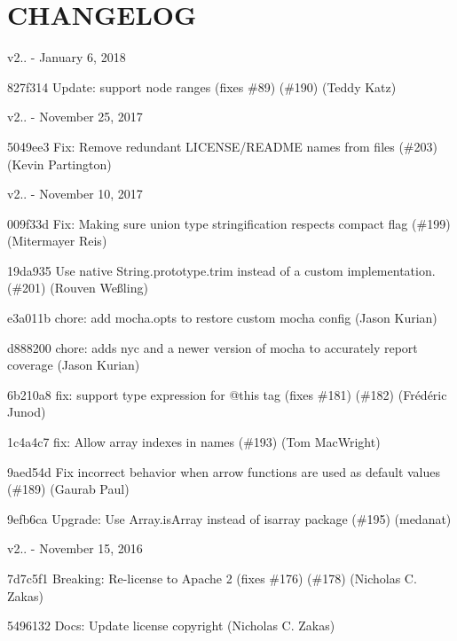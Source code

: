 \chapter{CHANGELOG}
\hypertarget{md_node__modules_2eslint-plugin-react_2node__modules_2doctrine_2CHANGELOG}{}\label{md_node__modules_2eslint-plugin-react_2node__modules_2doctrine_2CHANGELOG}
v2.. -\/ January 6, 2018


\begin{DoxyItemize}
\item 827f314 Update\+: support node ranges (fixes \#89) (\#190) (Teddy Katz)
\end{DoxyItemize}

v2.. -\/ November 25, 2017


\begin{DoxyItemize}
\item 5049ee3 Fix\+: Remove redundant LICENSE/\+README names from files (\#203) (Kevin Partington)
\end{DoxyItemize}

v2.. -\/ November 10, 2017


\begin{DoxyItemize}
\item 009f33d Fix\+: Making sure union type stringification respects compact flag (\#199) (Mitermayer Reis)
\item 19da935 Use native String.\+prototype.\+trim instead of a custom implementation. (\#201) (Rouven Weßling)
\item e3a011b chore\+: add mocha.\+opts to restore custom mocha config (Jason Kurian)
\item d888200 chore\+: adds nyc and a newer version of mocha to accurately report coverage (Jason Kurian)
\item 6b210a8 fix\+: support type expression for @this tag (fixes \#181) (\#182) (Frédéric Junod)
\item 1c4a4c7 fix\+: Allow array indexes in names (\#193) (Tom Mac\+Wright)
\item 9aed54d Fix incorrect behavior when arrow functions are used as default values (\#189) (Gaurab Paul)
\item 9efb6ca Upgrade\+: Use Array.\+is\+Array instead of isarray package (\#195) (medanat)
\end{DoxyItemize}

v2.. -\/ November 15, 2016


\begin{DoxyItemize}
\item 7d7c5f1 Breaking\+: Re-\/license to Apache 2 (fixes \#176) (\#178) (Nicholas C. Zakas)
\item 5496132 Docs\+: Update license copyright (Nicholas C. Zakas)
\end{DoxyItemize}

